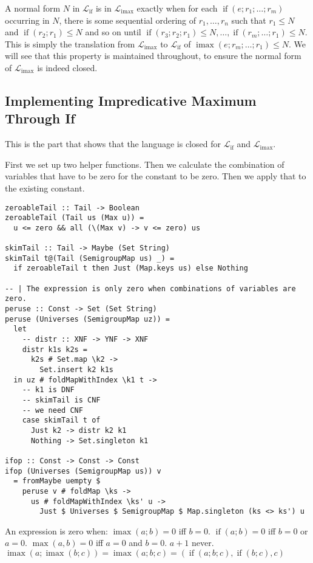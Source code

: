 \documentclass[11pt, twoside, reqno]{book}
\DeclareMathOperator{\imax}{imax}
\DeclareMathOperator{\ifop}{if}
\begin{document}
A normal form \(N\) in \(\mathcal{L}_{\ifop}\) is in \(\mathcal{L}_{\imax}\) exactly when for each \(\ifop(e; r_1; \dots; r_m)\) occurring in \(N\), there is some sequential ordering of \(r_1, \dots, r_n\) such that \(r_1 \le N\) and \(\ifop(r_2; r_1) \le N\) and so on until \(\ifop(r_3; r_2; r_1) \le N, \dots, \ifop(r_m; \dots; r_1) \le N\).
This is simply the translation from \(\mathcal{L}_{\imax}\) to \(\mathcal{L}_{\ifop}\) of \(\imax(e; r_m; \dots; r_1) \le N\).
We will see that this property is maintained throughout, to ensure the normal form of \(\mathcal{L}_{\imax}\) is indeed closed.

\subsection{Implementing Impredicative Maximum Through If}
This is the part that shows that the language is closed for \(\mathcal{L}_{\ifop}\) and \(\mathcal{L}_{\imax}\).

First we set up two helper functions.
Then we calculate the combination of variables that have to be zero for the constant to be zero.
Then we apply that to the existing constant.

\begin{verbatim}
zeroableTail :: Tail -> Boolean
zeroableTail (Tail us (Max u)) =
  u <= zero && all (\(Max v) -> v <= zero) us

skimTail :: Tail -> Maybe (Set String)
skimTail t@(Tail (SemigroupMap us) _) =
  if zeroableTail t then Just (Map.keys us) else Nothing

-- | The expression is only zero when combinations of variables are zero.
peruse :: Const -> Set (Set String)
peruse (Universes (SemigroupMap uz)) =
  let
    -- distr :: XNF -> YNF -> XNF
    distr k1s k2s =
      k2s # Set.map \k2 ->
        Set.insert k2 k1s
  in uz # foldMapWithIndex \k1 t ->
    -- k1 is DNF
    -- skimTail is CNF
    -- we need CNF
    case skimTail t of
      Just k2 -> distr k2 k1
      Nothing -> Set.singleton k1

ifop :: Const -> Const -> Const
ifop (Universes (SemigroupMap us)) v
  = fromMaybe uempty $
    peruse v # foldMap \ks ->
      us # foldMapWithIndex \ks' u ->
        Just $ Universes $ SemigroupMap $ Map.singleton (ks <> ks') u
\end{verbatim}

An expression is zero when:
\(\imax(a; b) = 0\) iff \(b = 0\).
\(\ifop(a; b) = 0\) iff \(b = 0\) or \(a = 0\).
\(\max(a, b) = 0\) iff \(a = 0\) and \(b = 0\).
\(a+1\) never.
\(\imax(a; \imax(b; c)) = \imax(a; b; c) = (\ifop(a; b; c), \ifop(b; c), c)\)
\end{document}
